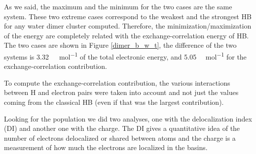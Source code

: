 As we said, the maximum and the minimum for the two cases are the same system.
These two extreme cases correspond to the weakest and the strongest HB for any
water dimer cluster computed. Therefore, the minimization/maximization of the
energy are completely related with the exchange-correlation energy of HB.  The
two cases are shown in Figure \ref{dimer_b_w_t}, the difference of the two
systems is \SI{3.32}{\kilo\calorie\per\mole} of the total electronic energy,
and 5.05 \si{\kilo\calorie\per\mole} for the exchange-correlation contribution.

\newpage

To compute the exchange-correlation contribution, the various interactions
between H and electron pairs were taken into account and not just the values
coming from the classical HB (even if that was the largest contribution).

Looking for the population we did two analyses, one with the delocalization
index (DI) and another one with the charge. The DI gives a quantitative idea of
the number of electrons delocalized or shared between atoms and the charge is a
measurement of how much the electrons are localized in the basins.

\newpage


